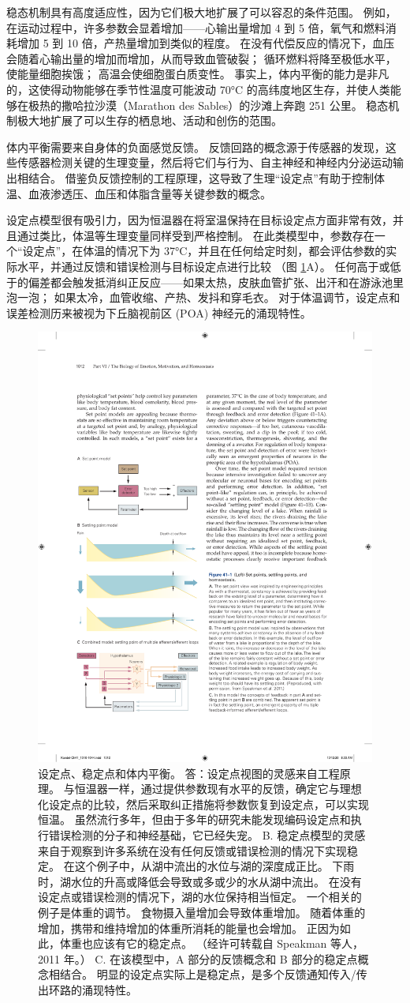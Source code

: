 稳态机制具有高度适应性，因为它们极大地扩展了可以容忍的条件范围。 例如，在运动过程中，许多参数会显着增加——心输出量增加 4 到 5 倍，氧气和燃料消耗增加 5 到 10 倍，产热量增加到类似的程度。 在没有代偿反应的情况下，血压会随着心输出量的增加而增加，从而导致血管破裂； 循环燃料将降至极低水平，使能量细胞挨饿； 高温会使细胞蛋白质变性。 事实上，体内平衡的能力是非凡的，这使得动物能够在季节性温度可能波动 70°C 的高纬度地区生存，并使人类能够在极热的撒哈拉沙漠（Marathon des Sables）的沙滩上奔跑 251 公里。 稳态机制极大地扩展了可以生存的栖息地、活动和创伤的范围。

体内平衡需要来自身体的负面感觉反馈。 反馈回路的概念源于传感器的发现，这些传感器检测关键的生理变量，然后将它们与行为、自主神经和神经内分泌运动输出相结合。 借鉴负反馈控制的工程原理，这导致了生理“设定点”有助于控制体温、血液渗透压、血压和体脂含量等关键参数的概念。

设定点模型很有吸引力，因为恒温器在将室温保持在目标设定点方面非常有效，并且通过类比，体温等生理变量同样受到严格控制。
在此类模型中，参数存在一个“设定点”，在体温的情况下为 37°C，并且在任何给定时刻，都会评估参数的实际水平，并通过反馈和错误检测与目标设定点进行比较 （图 \ref{fig:41_1}A）。 
任何高于或低于的偏差都会触发抵消纠正反应——如果太热，皮肤血管扩张、出汗和在游泳池里泡一泡； 如果太冷，血管收缩、产热、发抖和穿毛衣。 对于体温调节，设定点和误差检测历来被视为下丘脑视前区 (POA) 神经元的涌现特性。

\begin{figure}[htbp]
	\centering
	\includegraphics[width=0.5\linewidth]{chap41/fig_41_1}
	\caption{设定点、稳定点和体内平衡。 答：设定点视图的灵感来自工程原理。 与恒温器一样，通过提供参数现有水平的反馈，确定它与理想化设定点的比较，然后采取纠正措施将参数恢复到设定点，可以实现恒温。 虽然流行多年，但由于多年的研究未能发现编码设定点和执行错误检测的分子和神经基础，它已经失宠。 B. 稳定点模型的灵感来自于观察到许多系统在没有任何反馈或错误检测的情况下实现稳定。 在这个例子中，从湖中流出的水位与湖的深度成正比。 下雨时，湖水位的升高或降低会导致或多或少的水从湖中流出。 在没有设定点或错误检测的情况下，湖的水位保持相当恒定。 一个相关的例子是体重的调节。 食物摄入量增加会导致体重增加。 随着体重的增加，携带和维持增加的体重所消耗的能量也会增加。 正因为如此，体重也应该有它的稳定点。 （经许可转载自 Speakman 等人，2011 年。） C. 在该模型中，A 部分的反馈概念和 B 部分的稳定点概念相结合。 明显的设定点实际上是稳定点，是多个反馈通知传入/传出环路的涌现特性。}
	\label{fig:41_1}
\end{figure}

